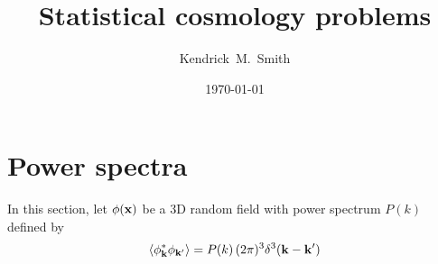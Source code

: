 \documentclass[aps,prd,superscriptaddress,groupedaddress,nofootinbib,nobibnotes]{revtex4}
\newcommand{\be}{\begin{equation}}
\newcommand{\ee}{\end{equation}}
\def\x{{\bf x}}
\def\k{{\bf k}}
\begin{document}
\title{Statistical cosmology problems}

\author{Kendrick~M.~Smith}

\date{\today}


\maketitle

\section{Power spectra}

\par\noindent
In this section, let $\phi(\x)$ be a 3D random field with power spectrum $P(k)$ defined by
\be
\langle \phi_{\k}^* \phi_{\k'} \rangle = P(k) \, (2\pi)^3 \delta^3(\k-\k')  \label{eq:pk_def}
\ee
\end{document}
